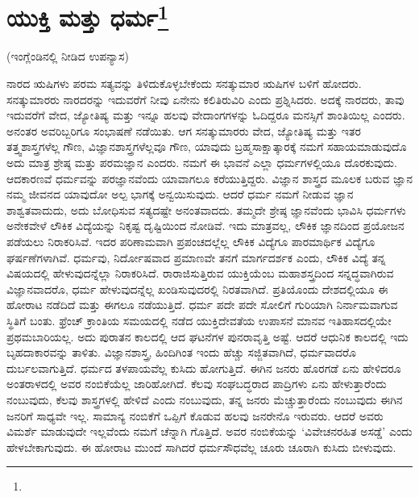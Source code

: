 
\chapter[ಯುಕ್ತಿ ಮತ್ತು ಧರ್ಮ]{ಯುಕ್ತಿ ಮತ್ತು ಧರ್ಮ\protect\footnote{}}

\begin{center}
(ಇಂಗ್ಲೆಂಡಿನಲ್ಲಿ ನೀಡಿದ ಉಪನ್ಯಾಸ)
\end{center}

ನಾರದ ಋಷಿಗಳು ಪರಮ ಸತ್ಯವನ್ನು ತಿಳಿದುಕೊಳ್ಳಬೇಕೆಂದು ಸನತ್ಕುಮಾರ ಋಷಿಗಳ ಬಳಿಗೆ ಹೋದರು. ಸನತ್ಕುಮಾರರು ನಾರದರನ್ನು ಇದುವರೆಗೆ ನೀವು ಏನೇನು ಕಲಿತಿರುವಿರಿ ಎಂದು ಪ್ರಶ್ನಿಸಿದರು. ಅದಕ್ಕೆ ನಾರದರು, ತಾವು ಇದುವರೆಗೆ ವೇದ, ಜ್ಯೋತಿಷ್ಯ ಮತ್ತು ಇನ್ನೂ ಹಲವು ವೇದಾಂಗಗಳನ್ನು ಓದಿದ್ದರೂ ಮನಸ್ಸಿಗೆ ಶಾಂತಿಯಿಲ್ಲ ಎಂದರು. ಅನಂತರ ಅವರಿಬ್ಬರಿಗೂ ಸಂಭಾಷಣೆ ನಡೆಯಿತು. ಆಗ ಸನತ್ಕುಮಾರರು ವೇದ, ಜ್ಯೋತಿಷ್ಯ ಮತ್ತು ಇತರ ತತ್ತ್ವಶಾಸ್ತ್ರಗಳೆಲ್ಲ ಗೌಣ, ವಿಜ್ಞಾನಶಾಸ್ತ್ರಗಳೆಲ್ಲವೂ ಗೌಣ, ಯಾವುದು ಬ್ರಹ್ಮಸಾಕ್ಷಾತ್ಕಾರಕ್ಕೆ ನಮಗೆ ಸಹಾಯಮಾಡುವುದೊ ಅದು ಮಾತ್ರ ಶ್ರೇಷ್ಠ ಮತ್ತು ಪರಮಜ್ಞಾನ ಎಂದರು. ನಮಗೆ ಈ ಭಾವನೆ ಎಲ್ಲಾ ಧರ್ಮಗಳಲ್ಲಿಯೂ ದೊರಕುವುದು. ಆದಕಾರಣವೆ ಧರ್ಮವನ್ನು ಪರಜ್ಞಾನವೆಂದು ಯಾವಾಗಲೂ ಕರೆಯುತ್ತಿದ್ದರು. ವಿಜ್ಞಾನ ಶಾಸ್ತ್ರದ ಮೂಲಕ ಬರುವ ಜ್ಞಾನ ನಮ್ಮ ಜೀವನದ ಯಾವುದೋ ಅಲ್ಪ ಭಾಗಕ್ಕೆ ಅನ್ವಯಿಸುವುದು. ಆದರೆ ಧರ್ಮ ನಮಗೆ ನೀಡುವ ಜ್ಞಾನ ಶಾಶ್ವತವಾದುದು, ಅದು ಬೋಧಿಸುವ ಸತ್ಯದಷ್ಟೇ ಅನಂತವಾದದು. ತಮ್ಮದೇ ಶ್ರೇಷ್ಠ ಜ್ಞಾನವೆಂದು ಭಾವಿಸಿ ಧರ್ಮಗಳು ಅನೇಕವೇಳೆ ಲೌಕಿಕ ವಿದ್ಯೆಯನ್ನು ನಿಕೃಷ್ಟ ದೃಷ್ಟಿಯಿಂದ ನೋಡಿವೆ. ಇದು ಮಾತ್ರವಲ್ಲ, ಲೌಕಿಕ ಜ್ಞಾನದಿಂದ ಪ್ರಯೋಜನ ಪಡೆಯಲು ನಿರಾಕರಿಸಿವೆ. ಇದರ ಪರಿಣಾಮವಾಗಿ ಪ್ರಪಂಚದಲ್ಲೆಲ್ಲ ಲೌಕಿಕ ವಿದ್ಯೆಗೂ ಪಾರಮಾರ್ಥಿಕ ವಿದ್ಯೆಗೂ ಘರ್ಷಣೆಗಳಾಗಿವೆ. ಧರ್ಮವು, ನಿರ್ದೋಷವಾದ ಪ್ರಮಾಣವೇ ತನಗೆ ಮಾರ್ಗದರ್ಶಕ ಎಂದು, ಲೌಕಿಕ ವಿದ್ಯೆ ತನ್ನ ವಿಷಯದಲ್ಲಿ ಹೇಳುವುದನ್ನೆಲ್ಲಾ ನಿರಾಕರಿಸಿದೆ. ರಾರಾಜಿಸುತ್ತಿರುವ ಯುಕ್ತಿಯೆಂಬ ಮಹಾಶಸ್ತ್ರದಿಂದ ಸನ್ನದ್ಧವಾಗಿರುವ ವಿಜ್ಞಾನವಾದರೊ, ಧರ್ಮ ಹೇಳುವುದನ್ನೆಲ್ಲ ಖಂಡಿಸುವುದರಲ್ಲಿ ನಿರತವಾಗಿದೆ. ಪ್ರತಿಯೊಂದು ದೇಶದಲ್ಲಿಯೂ ಈ ಹೋರಾಟ ನಡೆದಿದೆ ಮತ್ತು ಈಗಲೂ ನಡೆಯುತ್ತಿದೆ. ಧರ್ಮ ಪದೇ ಪದೇ ಸೋಲಿಗೆ ಗುರಿಯಾಗಿ ನಿರ್ನಾಮವಾಗುವ ಸ್ಥಿತಿಗೆ ಬಂತು. ಫ್ರೆಂಚ್ ಕ್ರಾಂತಿಯ ಸಮಯದಲ್ಲಿ ನಡೆದ ಯುಕ್ತಿದೇವತೆಯ ಉಪಾಸನೆ ಮಾನವ ಇತಿಹಾಸದಲ್ಲಿಯೇ ಪ್ರಥಮಬಾರಿಯಲ್ಲ. ಅದು ಪುರಾತನ ಕಾಲದಲ್ಲಿ ಆದ ಘಟನೆಗಳ ಪುನರಾವೃತ್ತಿ ಅಷ್ಟೆ. ಆದರೆ ಆಧುನಿಕ ಕಾಲದಲ್ಲಿ ಇದು ಬೃಹದಾಕಾರವನ್ನು ತಾಳಿತು. ವಿಜ್ಞಾನಶಾಸ್ತ್ರ, ಹಿಂದಿಗಿಂತ ಇಂದು ಹೆಚ್ಚು ಸಜ್ಜಿತವಾಗಿದೆ, ಧರ್ಮವಾದರೊ ದುರ್ಬಲವಾಗುತ್ತಿದೆ. ಧರ್ಮದ ತಳಪಾಯವೆಲ್ಲ ಕುಸಿದು ಹೋಗುತ್ತಿದೆ. ಈಗಿನ ಜನರು ಹೊರಗಡೆ ಏನು ಹೇಳಿದರೂ ಅಂತರಾಳದಲ್ಲಿ ಅವರ ನಂಬಿಕೆಯೆಲ್ಲ ಜಾರಿಹೋಗಿದೆ. ಕೆಲವು ಸಂಘಬದ್ಧರಾದ ಪಾದ್ರಿಗಳು ಏನು ಹೇಳುತ್ತಾರೆಂದು ನಂಬುವುದು, ಕೆಲವು ಶಾಸ್ತ್ರಗಳಲ್ಲಿ ಹೇಳಿದೆ ಎಂದು ನಂಬುವುದು, ತನ್ನ ಜನರು ಮೆಚ್ಚುತ್ತಾರೆಂದು ನಂಬುವುದು ಈಗಿನ ಜನರಿಗೆ ಸಾಧ್ಯವೇ ಇಲ್ಲ. ಸಾಮಾನ್ಯ ನಂಬಿಕೆಗೆ ಒಪ್ಪಿಗೆ ಕೊಡುವ ಹಲವು ಜನರೇನೊ ಇರುವರು. ಆದರೆ ಅವರು ವಿಮರ್ಶೆ ಮಾಡುವುದೇ ಇಲ್ಲವೆಂದು ನಮಗೆ ಚೆನ್ನಾಗಿ ಗೊತ್ತಿದೆ. ಅವರ ನಂಬಿಕೆಯನ್ನು `ವಿವೇಚನರಹಿತ ಅಸಡ್ಡೆ' ಎಂದು ಹೇಳಬೇಕಾಗುವುದು. ಈ ಹೋರಾಟ ಮುಂದೆ ಸಾಗಿದರೆ ಧರ್ಮಸೌಧವೆಲ್ಲ ಚೂರು ಚೂರಾಗಿ ಕುಸಿದು ಬೀಳುವುದು.

